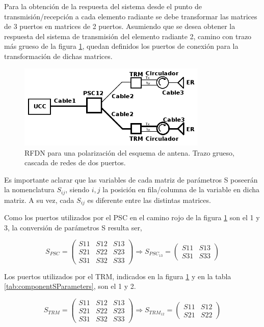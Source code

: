 Para la obtención de la respuesta del sistema desde el punto de transmisión/recepción a cada elemento radiante se debe
transformar las matrices de 3 puertos en matrices de 2 puertos. Asumiendo que se desea obtener la respuesta del sistema de
transmisión del elemento radiante 2, camino con trazo más grueso de la figura \ref{fig:antennaSLoop}, quedan definidos los puertos de
conexión para la transformación de dichas matrices.

\begin{figure}[H]
 \centering
 \includegraphics[width=9cm]{gfx/RFDNLoop.png}
 \caption{RFDN para una polarización del esquema de antena. Trazo grueso, cascada de redes de dos puertos.}
 \label{fig:antennaSLoop}
\end{figure}

Es importante aclarar que las variables de cada matriz de parámetros S poseerán la nomenclatura $S_{ij}$, siendo $i,j$ la
posición en fila/columna de la variable en dicha matriz. A su vez, cada $S_{ij}$ es diferente entre las distintas matrices. 

Como los puertos utilizados por el PSC en el camino rojo de la figura \ref{fig:antennaSLoop} son el 1 y 3, la conversión de
parámetros S resulta ser,

$$
	S_{PSC} = \begin{pmatrix} S11&S12&S13 \\ S21&S22&S23 \\ S31&S32&S33\end{pmatrix} \Rightarrow
	S_{PSC_{13}} = \begin{pmatrix} S11&S13 \\ S31&S33 \end{pmatrix}
$$

Los puertos utilizados por el TRM, indicados en la figura \ref{fig:antennaSLoop} y en la tabla \ref{tab:componentSParameters},
son el 1 y 2. 

$$
	S_{TRM} = \begin{pmatrix} S11&S12&S13 \\ S21&S22&S23 \\ S31&S32&S33\end{pmatrix} \Rightarrow
	S_{TRM_{12}} = \begin{pmatrix} S11&S12 \\ S21&S22 \end{pmatrix}
$$

